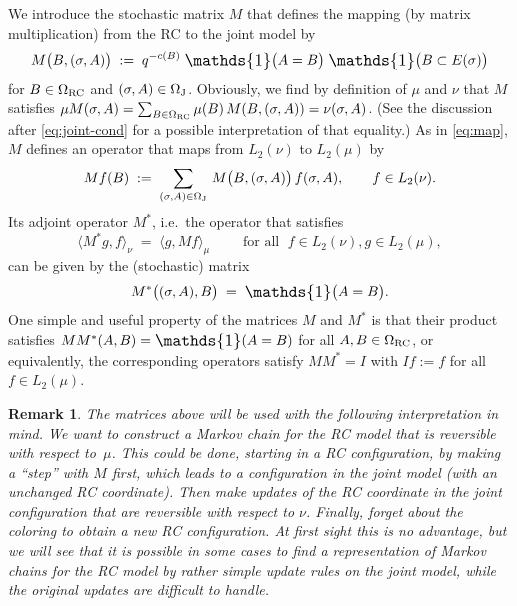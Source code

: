 \documentclass{dis}
\newtheorem{remark}[theorem]{Remark}
\theoremstyle{citing}
\begin{document}
We introduce the stochastic matrix $M$ that defines the mapping 
(by matrix multiplication) from the RC to the joint model by
\begin{equation} \label{eq:M}
M\bigl(B,(\sigma,A)\bigr) \;:=\; q^{-c(B)}\;{\scalebox{1.2}{\raisebox{-0.2mm}{$\mathds{1}$}}}\bigl(A=B\bigr)\;
	{\scalebox{1.2}{\raisebox{-0.2mm}{$\mathds{1}$}}}\bigl(B\subset E(\sigma)\bigr)
\end{equation}
for $B\in{{\Omega}_{\rm RC}}$ and $(\sigma,A)\in{{\Omega}_{\rm J}}$.
Obviously, we find by definition of $\mu$ and $\nu$ that 
$M$ satisfies
$\mu M (\sigma,A)=\sum_{B\in{{\Omega}_{\rm RC}}}\mu(B)\, M(B,(\sigma,A))
	=\nu(\sigma,A)$.
(See the discussion after \eqref{eq:joint-cond} 
for a possible interpretation of that equality.)
As in \eqref{eq:map}, $M$ defines an operator that 
maps from $L_2(\nu)$ to $L_2(\mu)$ by 
\begin{equation} \label{eq:map2}
Mf(B) \;:=\; \sum_{(\sigma,A)\in{{\Omega}_{\rm J}}}\,M\bigl(B,(\sigma,A)\bigr)\,
	f(\sigma,A), \qquad f\in L_2(\nu).
\end{equation}
Its adjoint operator $M^*$, i.e.~the operator that satisfies
\[
{\langle} M^*g, f{\rangle}_\nu \;=\; {\langle} g,Mf{\rangle}_\mu \qquad 
	\text{ for all }\; f\in L_2(\nu), g\in L_2(\mu), 
\]
can be given by the (stochastic) matrix
\[
M^*\bigl((\sigma,A),B\bigr) \;=\; {\scalebox{1.2}{\raisebox{-0.2mm}{$\mathds{1}$}}}\bigl(A=B\bigr).
\]
One simple and useful property of the matrices $M$ and $M^*$ is 
that their product satisfies 
$M M^*(A,B)={\scalebox{1.2}{\raisebox{-0.2mm}{$\mathds{1}$}}}(A=B)$ for all $A,B\in{{\Omega}_{\rm RC}}$, or 
equivalently, the corresponding operators satisfy 
$M M^* = I$ with $If:=f$ for all $f\in L_2(\mu)$.

\begin{remark}
The matrices above will be used with the following 
interpretation in mind.
We want to construct a Markov chain for the RC model that 
is reversible with respect to~$\mu$. 
This could be done, starting in a RC configuration, 
by making a ``step'' with $M$ first, which leads to 
a configuration in the joint model 
(with an unchanged RC coordinate). 
Then make updates of the RC coordinate in the joint 
configuration that are reversible with respect to $\nu$.
Finally, forget about the coloring to obtain a new 
RC configuration.
At first sight this is no advantage, but we will see that 
it is possible in some cases to find a representation 
of Markov chains for the RC model by rather simple update 
rules on the joint model, while the original updates 
are difficult to handle.
\end{remark}
\vspace{2mm}
\end{document}

